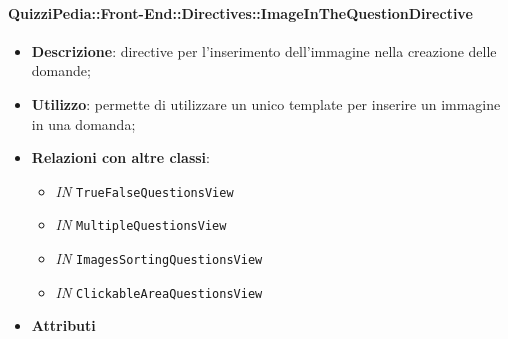 \paragraph{QuizziPedia::Front-End::Directives::ImageInTheQuestionDirective}
\begin{itemize}
	\item \textbf{Descrizione}: directive per l'inserimento dell'immagine nella creazione delle domande;
	\item \textbf{Utilizzo}: permette di utilizzare un unico template per inserire un immagine in una domanda;
	\item \textbf{Relazioni con altre classi}:
	\begin{itemize}
		\item \textit{IN} \texttt{TrueFalseQuestionsView} \\
		\item \textit{IN} \texttt{MultipleQuestionsView} \\
		\item \textit{IN} \texttt{ImagesSortingQuestionsView} \\
		\item \textit{IN} \texttt{ClickableAreaQuestionsView} \\
	\end{itemize}
	\item \textbf{Attributi}
\end{itemize}